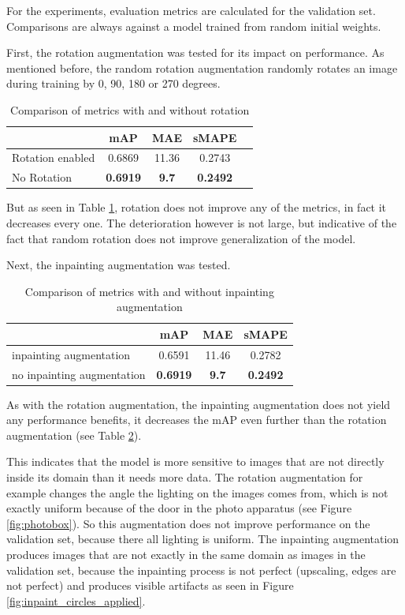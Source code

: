 For the experiments, evaluation metrics are calculated for the validation set. Comparisons are always against a model trained from random initial weights.

First, the rotation augmentation was tested for its impact on performance. As mentioned before, the random rotation augmentation randomly rotates an image during training by 0, 90, 180 or 270 degrees.

\begin{table}[h]
\centering
\begin{tabular}{lcccc}
\hline
  & mAP & MAE & sMAPE \\
\hline
Rotation enabled  & 0.6869 & 11.36 & 0.2743 \\
No Rotation  & \textbf{0.6919} & \textbf{9.7} & \textbf{0.2492} \\
\hline
\end{tabular}
\caption{Comparison of metrics with and without rotation}
\label{table:rotation_metrics}
\end{table}

But as seen in Table \ref{table:rotation_metrics}, rotation does not improve any of the metrics, in fact it decreases every one. The deterioration however is not large, but indicative of the fact that random rotation does not improve generalization of the model.

Next, the inpainting augmentation was tested.

\begin{table}[h]
\centering
\begin{tabular}{lccc}
\hline
 & mAP & MAE & sMAPE \\
\hline
inpainting augmentation & 0.6591 & 11.46 & 0.2782 \\
no inpainting augmentation & \textbf{0.6919} & \textbf{9.7} & \textbf{0.2492} \\
\hline
\end{tabular}
\caption{Comparison of metrics with and without inpainting augmentation}
\label{table:inpainting_metrics}
\end{table}

As with the rotation augmentation, the inpainting augmentation does not yield any performance benefits, it decreases the mAP even further than the rotation augmentation (see Table \ref{table:inpainting_metrics}).

This indicates that the model is more sensitive to images that are not directly inside its domain than it needs more data. The rotation augmentation for example changes the angle the lighting on the images comes from, which is not exactly uniform because of the door in the photo apparatus (see Figure \ref{fig:photobox}). So this augmentation does not improve performance on the validation set, because there all lighting is uniform. The inpainting augmentation produces images that are not exactly in the same domain as images in the validation set, because the inpainting process is not perfect (upscaling, edges are not perfect) and produces visible artifacts as seen in Figure \ref{fig:inpaint_circles_applied}.

